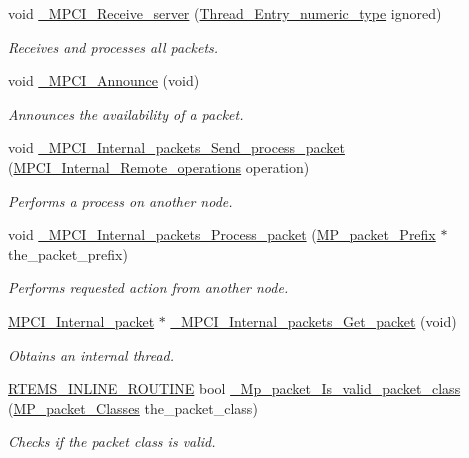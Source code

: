 \begin{DoxyCompactItemize}
void \mbox{\hyperlink{group__RTEMSScoreMPCI_gaf232dadc9160e4b1c733906d3a6d1f57}{\+\_\+\+M\+P\+C\+I\+\_\+\+Receive\+\_\+server}} (\mbox{\hyperlink{group__RTEMSScoreThread_gab56e437830bb9a4af5b27ac7ec503b6a}{Thread\+\_\+\+Entry\+\_\+numeric\+\_\+type}} ignored)
\begin{DoxyCompactList}\small\item\em Receives and processes all packets. \end{DoxyCompactList}\item 
void \mbox{\hyperlink{group__RTEMSScoreMPCI_gaafbd7ed1ef4bd2b8672df8da832f79f4}{\+\_\+\+M\+P\+C\+I\+\_\+\+Announce}} (void)
\begin{DoxyCompactList}\small\item\em Announces the availability of a packet. \end{DoxyCompactList}\item 
void \mbox{\hyperlink{group__RTEMSScoreMPCI_ga63356f90abac093ad7d8817cedf1da28}{\+\_\+\+M\+P\+C\+I\+\_\+\+Internal\+\_\+packets\+\_\+\+Send\+\_\+process\+\_\+packet}} (\mbox{\hyperlink{group__RTEMSScoreMPCI_ga04a2fa1c1617558e729e75700624cdb7}{M\+P\+C\+I\+\_\+\+Internal\+\_\+\+Remote\+\_\+operations}} operation)
\begin{DoxyCompactList}\small\item\em Performs a process on another node. \end{DoxyCompactList}\item 
void \mbox{\hyperlink{group__RTEMSScoreMPCI_gae202814c7151db9baf145786aa4ef068}{\+\_\+\+M\+P\+C\+I\+\_\+\+Internal\+\_\+packets\+\_\+\+Process\+\_\+packet}} (\mbox{\hyperlink{structMP__packet__Prefix}{M\+P\+\_\+packet\+\_\+\+Prefix}} $\ast$the\+\_\+packet\+\_\+prefix)
\begin{DoxyCompactList}\small\item\em Performs requested action from another node. \end{DoxyCompactList}\item 
\mbox{\hyperlink{structMPCI__Internal__packet}{M\+P\+C\+I\+\_\+\+Internal\+\_\+packet}} $\ast$ \mbox{\hyperlink{group__RTEMSScoreMPCI_gaa1dfe78c5adee4604729d791941634a6}{\+\_\+\+M\+P\+C\+I\+\_\+\+Internal\+\_\+packets\+\_\+\+Get\+\_\+packet}} (void)
\begin{DoxyCompactList}\small\item\em Obtains an internal thread. \end{DoxyCompactList}\item 
\mbox{\hyperlink{group__RTEMSScoreBaseDefs_gac216239df231d5dbd15e3520b0b9313f}{R\+T\+E\+M\+S\+\_\+\+I\+N\+L\+I\+N\+E\+\_\+\+R\+O\+U\+T\+I\+NE}} bool \mbox{\hyperlink{group__RTEMSScoreMPCI_gacbb0099162582a23bc5a251b5a763612}{\+\_\+\+Mp\+\_\+packet\+\_\+\+Is\+\_\+valid\+\_\+packet\+\_\+class}} (\mbox{\hyperlink{group__RTEMSScoreMPPacket_gafed9717210f8917e5acb8e63f2c6bac3}{M\+P\+\_\+packet\+\_\+\+Classes}} the\+\_\+packet\+\_\+class)
\begin{DoxyCompactList}\small\item\em Checks if the packet class is valid. \end{DoxyCompactList}\end{DoxyCompactItemize}
